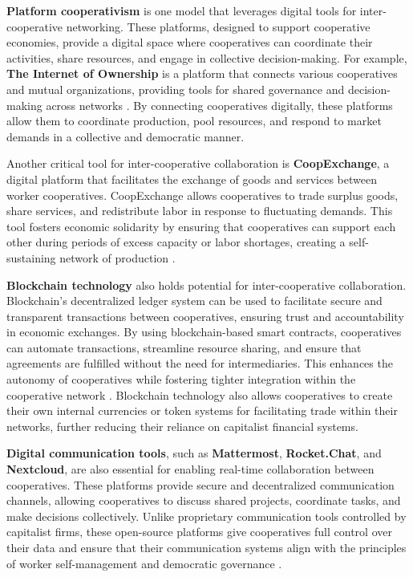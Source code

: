 \begin{refsection}
\textbf{Platform cooperativism} is one model that leverages digital tools for inter-cooperative networking. These platforms, designed to support cooperative economies, provide a digital space where cooperatives can coordinate their activities, share resources, and engage in collective decision-making. For example, \textbf{The Internet of Ownership} is a platform that connects various cooperatives and mutual organizations, providing tools for shared governance and decision-making across networks \cite[pp.~119-123]{scholz2016}. By connecting cooperatives digitally, these platforms allow them to coordinate production, pool resources, and respond to market demands in a collective and democratic manner.

Another critical tool for inter-cooperative collaboration is \textbf{CoopExchange}, a digital platform that facilitates the exchange of goods and services between worker cooperatives. CoopExchange allows cooperatives to trade surplus goods, share services, and redistribute labor in response to fluctuating demands. This tool fosters economic solidarity by ensuring that cooperatives can support each other during periods of excess capacity or labor shortages, creating a self-sustaining network of production \cite[pp.~204-207]{restakis2012}.

\textbf{Blockchain technology} also holds potential for inter-cooperative collaboration. Blockchain’s decentralized ledger system can be used to facilitate secure and transparent transactions between cooperatives, ensuring trust and accountability in economic exchanges. By using blockchain-based smart contracts, cooperatives can automate transactions, streamline resource sharing, and ensure that agreements are fulfilled without the need for intermediaries. This enhances the autonomy of cooperatives while fostering tighter integration within the cooperative network \cite[pp.~145-148]{tapscott2016}. Blockchain technology also allows cooperatives to create their own internal currencies or token systems for facilitating trade within their networks, further reducing their reliance on capitalist financial systems.

\textbf{Digital communication tools}, such as \textbf{Mattermost}, \textbf{Rocket.Chat}, and \textbf{Nextcloud}, are also essential for enabling real-time collaboration between cooperatives. These platforms provide secure and decentralized communication channels, allowing cooperatives to discuss shared projects, coordinate tasks, and make decisions collectively. Unlike proprietary communication tools controlled by capitalist firms, these open-source platforms give cooperatives full control over their data and ensure that their communication systems align with the principles of worker self-management and democratic governance \cite[pp.~67-70]{wright2010}.


\end{refsection}
